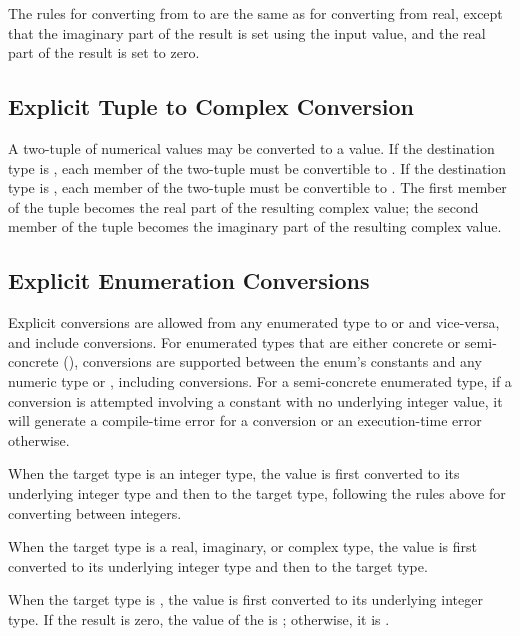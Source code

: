 The rules for converting from  to  are the same as for
converting from real, except that the imaginary part of the result is set using
the input value, and the real part of the result is set to zero.

\subsection{Explicit Tuple to Complex Conversion}
\label{Explicit_Tuple_to_Complex_Conversion}

A two-tuple of numerical values may be converted to a  value.  If
the destination type is , each member of the two-tuple must
be convertible to .  If the destination type
is , each member of the two-tuple must be convertible
to .  The first member of the tuple becomes the real part of the
resulting complex value; the second member of the tuple becomes the imaginary
part of the resulting complex value.

\subsection{Explicit Enumeration Conversions}
\label{Explicit_Enumeration_Conversions}

Explicit conversions are allowed from any enumerated type to
 or  and vice-versa, and include  conversions.
For enumerated types that are either concrete or semi-concrete
(), conversions are supported between the
enum's constants and any numeric type or ,
including  conversions.  For a semi-concrete enumerated
type, if a conversion is attempted involving a constant with no
underlying integer value, it will generate a compile-time error for
a  conversion or an execution-time error otherwise.

When the target type is an integer type, the value is first converted to its
underlying integer type and then to the target type, following the rules above
for converting between integers.

When the target type is a real, imaginary, or complex type, the value
is first converted to its underlying integer type and then to the
target type.

When the target type is , the value is first converted to its
underlying integer type.  If the result is zero, the value of the 
is ; otherwise, it is .

